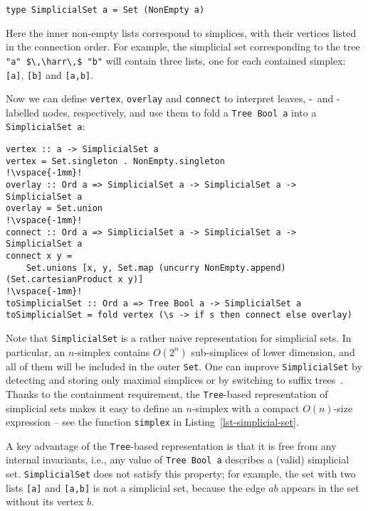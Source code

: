 \documentclass[crc,english]{programming}
\newcommand{\code}[1]{\lstinline[mathescape]|#1|}
\newcommand{\hcode}[1]{{\color{darkblue} \lstinline[keywordstyle={}]|#1|}} %
\newcommand{\harr}{\,\text{\color{darkblue} $\rightarrow$}\,}
\newcommand{\zero}{\raisebox{-0.2mm}{\textcircled{\textsf{0}}}\xspace}
\newcommand{\one}{\raisebox{-0.2mm}{\textcircled{\textsf{\hspace{-0.2mm}1}}}\xspace}
\begin{document}
\begin{lstlisting}
type SimplicialSet a = Set (NonEmpty a)
\end{lstlisting}

\noindent
Here the inner non-empty lists correspond to simplices, with their vertices
listed in the connection order. For example, the simplicial set corresponding to
the tree \code{"a" $\,\harr\,$ "b"} will contain three lists, one for each
contained simplex: \code{[a]}, \code{[b]} and \code{[a,b]}.

Now we can define \hcode{vertex}, \hcode{overlay} and \hcode{connect} to
interpret leaves, \zero-~and \one-labelled nodes, respectively, and
use them to fold a \hcode{Tree Bool a} into a \hcode{SimplicialSet a}:

\begin{lstlisting}
vertex :: a -> SimplicialSet a
vertex = Set.singleton . NonEmpty.singleton
!\vspace{-1mm}!
overlay :: Ord a => SimplicialSet a -> SimplicialSet a -> SimplicialSet a
overlay = Set.union
!\vspace{-1mm}!
connect :: Ord a => SimplicialSet a -> SimplicialSet a -> SimplicialSet a
connect x y =
    Set.unions [x, y, Set.map (uncurry NonEmpty.append) (Set.cartesianProduct x y)]
!\vspace{-1mm}!
toSimplicialSet :: Ord a => Tree Bool a -> SimplicialSet a
toSimplicialSet = fold vertex (\s -> if s then connect else overlay)
\end{lstlisting}

\noindent
Note that \hcode{SimplicialSet} is a rather naive representation for simplicial
sets. In particular, an $n$-simplex contains $O(2^n)$ sub-simplices of
lower dimension, and all of them will be included in the outer \hcode{Set}. One
can improve \hcode{SimplicialSet} by detecting and storing only maximal
simplices or by switching to suffix trees~\cite{weiner_suffix_trees}. Thanks to
the containment requirement, the \hcode{Tree}-based representation of simplicial
sets makes it easy to define an $n$-simplex with a compact $O(n)$-size
expression -- see the function \hcode{simplex} in
Listing~\ref{lst-simplicial-set}.

A key advantage of the \hcode{Tree}-based representation is that it is free from
any internal invariants, i.e., any value of \hcode{Tree Bool a} describes a
(valid) simplicial set. \hcode{SimplicialSet} does not satisfy this property;
for example, the set with two lists \code{[a]} and \code{[a,b]} is not a
simplicial set, because the edge $\textit{ab}$ appears in the set without its
vertex $\textit{b}$.
\end{document}
